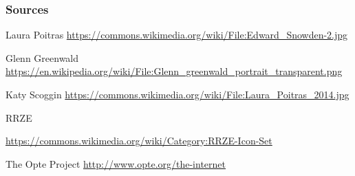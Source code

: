 \documentclass{beamer}
\begin{document}

\begin{frame}
\frametitle{Sources}
\small
\begin{thebibliography}{1}
	 Laura Poitras \small \url{https://commons.wikimedia.org/wiki/File:Edward_Snowden-2.jpg} 
	
	 Glenn Greenwald \small \url{https://en.wikipedia.org/wiki/File:Glenn_greenwald_portrait_transparent.png}
	
	 Katy Scoggin \small \url{https://commons.wikimedia.org/wiki/File:Laura_Poitras_2014.jpg}
	
	 RRZE \item \url{https://commons.wikimedia.org/wiki/Category:RRZE-Icon-Set}
	
	  The Opte Project \small \url{http://www.opte.org/the-internet}

\end{thebibliography}
\end{frame}


\end{document}
